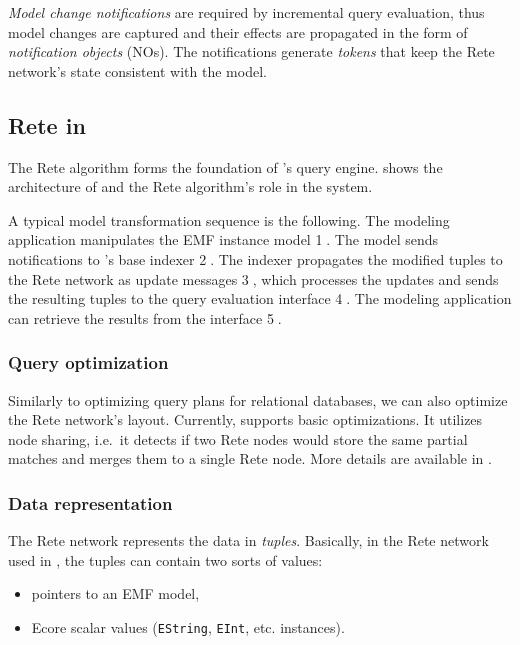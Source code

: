 \emph{Model change notifications} are required by incremental query evaluation, thus model changes are captured and their effects are propagated in the form of \emph{notification objects} (NOs). The notifications generate \emph{tokens} that keep the Rete network's state consistent with the model. 


\subsection{Rete in \eiq{}}

The Rete algorithm forms the foundation of \eiq{}'s query engine.  shows the architecture of \eiq{} and the Rete algorithm's role in the system. 

A typical model transformation sequence is the following. The modeling application manipulates the EMF instance model \textcircled{1}. The model sends notifications to \eiq{}'s base indexer \textcircled{2}. The indexer propagates the modified tuples to the Rete network as update messages \textcircled{3}, which processes the updates and sends the resulting tuples to the query evaluation interface \textcircled{4}. The modeling application can retrieve the results from the interface \textcircled{5}.


\subsubsection{Query optimization}

Similarly to optimizing query plans for relational databases, we can also optimize the Rete network's layout. Currently, \eiq{} supports basic optimizations. It utilizes node sharing, i.e.\ it detects if two Rete nodes would store the same partial matches and merges them to a single Rete node. More details are available in \cite{BergmannPhD}.

\subsubsection{Data representation}

The Rete network represents the data in \emph{tuples}. Basically, in the Rete network used in \eiq{}, the tuples can contain two sorts of values:
\begin{itemize}
  \item pointers to an EMF model,
  \item Ecore scalar values (\verb+EString+, \verb+EInt+, etc. instances).
\end{itemize}

